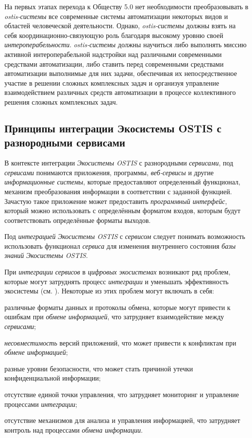 На первых этапах перехода к Обществу 5.0 нет необходимости преобразовывать в \textit{ostis-системы} все современные системы автоматизации некоторых видов и областей человеческой деятельности. 
Однако, \textit{ostis-системы} должны взять на себя координационно-связующую роль благодаря высокому уровню своей \textit{интероперабельности}. 
\textit{ostis-системы} должны научиться либо выполнять миссию активной интероперабельной надстройки над различными современными средствами автоматизации, либо ставить перед современными средствами автоматизации выполнимые для них задачи, обеспечивая их непосредственное участие в решении сложных комплексных задач и организуя управление взаимодействием различных средств автоматизации в процессе коллективного решения сложных комплексных задач.

\subsection{Принципы интеграции Экосистемы OSTIS с разнородными сервисами}
{\label{sec_integration_services}} 

В контексте интеграции \textit{Экосистемы OSTIS} с разнородными \textit{сервисами}, под \textit{сервисами} понимаются приложения, программы, \textit{веб-сервисы} и другие \textit{информационные системы}, которые предоставляют определенный функционал, механизм преобразования информации в соответствии с заданной функцией. Зачастую такое приложение может предоставить \textit{программный интерфейс}, который можно использовать с определённым форматом входов, которым будут соответствовать определённые форматы выходов.

Под \textit{интеграцией} \textit{Экосистемы OSTIS} с \textit{сервисом} следует понимать возможность использовать функционал \textit{сервиса} для изменения внутреннего состояния \textit{базы знаний} \textit{Экосистемы OSTIS}. 

При \textit{интеграции} \textit{сервисов} в \textit{цифровых экосистемах} возникают ряд проблем, которые могут затруднять процесс \textit{интеграции} и уменьшать эффективность экосистемы (см. ). Некоторые из этих проблем могут включать в себя:

\begin{textitemize}
    \item различные форматы данных и протоколы обмена, которые могут привести к ошибкам при \textit{обмене информацией}, что затрудняет взаимодействие между \textit{сервисами};
    \item \textit{несовместимость} версий приложений, что может привести к конфликтам при \textit{обмене информацией};
    \item разные уровни безопасности, что может стать причиной утечки конфиденциальной информации;
    \item отсутствие единой точки управления, что затрудняет мониторинг и управление процессами \textit{интеграции};
    \item отсутствие механизмов для анализа и управления информацией, что затрудняет контроль над процессами \textit{обмена информации}.
\end{textitemize}

